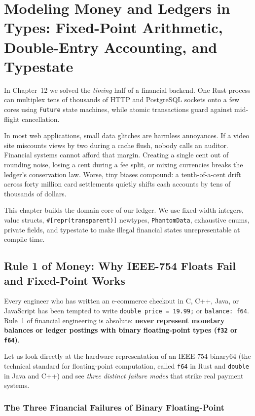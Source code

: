 \chapter{Modeling Money and Ledgers in Types: Fixed-Point Arithmetic, Double-Entry Accounting, and Typestate}

In Chapter~12 we solved the \emph{timing} half of a financial backend. One Rust process can multiplex tens of thousands of HTTP and PostgreSQL sockets onto a few cores using \texttt{Future} state machines, while atomic transactions guard against mid-flight cancellation.

In most web applications, small data glitches are harmless annoyances. If a video site miscounts views by two during a cache flush, nobody calls an auditor. Financial systems cannot afford that margin. Creating a single cent out of rounding noise, losing a cent during a fee split, or mixing currencies breaks the ledger's conservation law. Worse, tiny biases compound: a tenth-of-a-cent drift across forty million card settlements quietly shifts cash accounts by tens of thousands of dollars.

This chapter builds the domain core of our ledger. We use fixed-width integers, value structs, \texttt{\#[repr(transparent)]} newtypes, \texttt{PhantomData}, exhaustive enums, private fields, and typestate to make illegal financial states unrepresentable at compile time.

\chapterline

\section{Rule 1 of Money: Why IEEE-754 Floats Fail and Fixed-Point Works}
\label{ch13:fixed-point-and-decimals}

Every engineer who has written an e-commerce checkout in C, C++, Java, or JavaScript has been tempted to write \texttt{double price = 19.99;} or \texttt{balance: f64}. Rule~1 of financial engineering is absolute: \textbf{never represent monetary balances or ledger postings with binary floating-point types (\texttt{f32} or \texttt{f64})}.

Let us look directly at the hardware representation of an IEEE-754 binary64 (the technical standard for floating-point computation, called \texttt{f64} in Rust and \texttt{double} in Java and C++) and see \emph{three distinct failure modes} that strike real payment systems.

\subsection{The Three Financial Failures of Binary Floating-Point}

